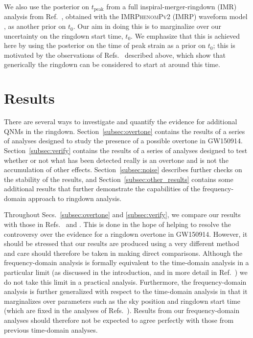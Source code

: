 We also use the posterior on $t_\mathrm{peak}$ from a full inspiral-merger-ringdown (IMR) analysis from Ref.~\cite{Isi:2022mhy}, obtained with the \textsc{IMRPhenomPv2} (IMRP) waveform model \cite{Hannam:2013oca}, as another prior on $t_0$. 
Our aim in doing this is to marginalize over our uncertainty on the ringdown start time, $t_0$. 
We emphasize that this is achieved here by using the posterior on the time of peak strain as a prior on $t_0$; this is motivated by the observations of Refs.~\cite{Giesler:2019uxc, Bhagwat:2019dtm, Ota:2019bzl, Cook:2020otn, JimenezForteza:2020cve, Dhani:2020nik, Finch:2021iip, Forteza:2021wfq, Dhani:2021vac, MaganaZertuche:2021syq} described above, which show that generically the ringdown can be considered to start at around this time.


\section{Results}\label{sec:results}

There are several ways to investigate and quantify the evidence for additional QNMs in the ringdown.
Section~\ref{subsec:overtone} contains the results of a series of analyses designed to study the presence of a possible overtone in GW150914.
Section~\ref{subsec:verify} contains the results of a series of analyses designed to test whether or not what has been detected really is an overtone and is not the accumulation of other effects.
Section~\ref{subsec:noise} describes further checks on the stability of the results, and
Section~\ref{subsec:other_results} contains some additional results that further demonstrate the capabilities of the frequency-domain approach to ringdown analysis.

Throughout Secs.~\ref{subsec:overtone} and \ref{subsec:verify}, we compare our results with those in Refs.~\cite{Cotesta:2022pci} and \cite{Isi:2022mhy}. 
This is done in the hope of helping to resolve the controversy over the evidence for a ringdown overtone in GW150914. 
However, it should be stressed that our results are produced using a very different method and care should therefore be taken in making direct comparisons.
Although the frequency-domain analysis is formally equivalent to the time-domain analysis in a particular limit (as discussed in the introduction, and in more detail in Ref.~\cite{Finch:2021qph}) we do not take this limit in a practical analysis. Furthermore, the frequency-domain analysis is further generalized with respect to the time-domain analysis in that it marginalizes over parameters such as the sky position and ringdown start time (which are fixed in the analyses of Refs.~\cite{Cotesta:2022pci, Isi:2022mhy}).
Results from our frequency-domain analyses should therefore not be expected to agree perfectly with those from previous time-domain analyses.


